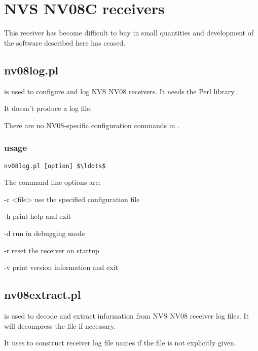 \section{NVS NV08C receivers}

This receiver has become difficult to buy in small quantities and development 
of the software described here has ceased.

\subsection{nv08log.pl} \hypertarget{h:nvslog}{}

 is used to configure and log NVS NV08 receivers.
It needs the Perl library .

It doesn't produce a log file.

There are no NV08-specific configuration commands in .



\subsubsection{usage}

\begin{lstlisting}[mathescape=true]
nv08log.pl [option] $\ldots$ 
\end{lstlisting}

The command line options are:
\begin{description*}
	\item[-c \textless{file}\textgreater] use the specified configuration file
	\item[-h] print help and exit
	\item[-d] run in debugging mode
	\item[-r] reset the receiver on startup
	\item[-v] print version information and exit
\end{description*}

\subsection{nv08extract.pl} \hypertarget{h:nv08extract}{}

 is used to decode and extract information from NVS NV08 receiver log files. 
It will decompress the file if necessary.

It uses  to construct receiver log file names if the file is not explicitly given.

